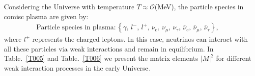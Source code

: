 Considering the Universe with temperature $T\approx\mathcal{O}$(MeV), the   particle species in comisc plasma are given by:
\begin{align}
\mathrm{Particle\,\,species\,\, in \,\,plasma:}
\left\{\gamma,\, l^-,\,l^+,\, \nu_e,\, \nu_\mu,\, \nu_\tau,\, \bar{\nu}_e,\, \bar{\nu}_\mu,\, \bar{\nu}_\tau\right\},
\end{align}
 where $l^\pm$ represents the charged leptons. In this case, neutrinos can interact with all these particles via weak interactions and remain in equilibrium. In Table.~\ref{T005} and Table.~\ref{T006} we present the matrix elements $|M|^2$ for different weak interaction processes in the early Universe.

